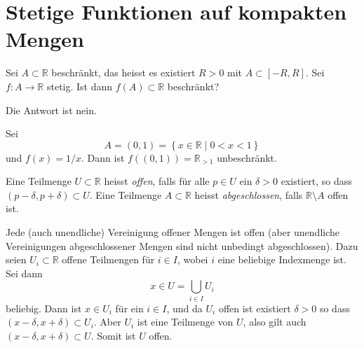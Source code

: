 \documentclass[../main.tex]{subfiles}
\begin{document}
\section{Stetige Funktionen auf kompakten Mengen}

\begin{question}
Sei $A \subset \mathbb{R}$ beschränkt,
das heisst es existiert $R > 0$ 
mit $A \subset [-R, R]$.
Sei $f \colon A \to \mathbb{R}$ stetig.
Ist dann $f(A) \subset \mathbb{R}$ beschränkt?
\end{question}

Die Antwort ist nein. 

\begin{example}
  Sei 
  \[
    A = (0, 1) = \left\{x \in \mathbb{R} \mid 0 < x < 1\right\}
  \]
  und $f(x) = 1/x$. Dann ist $f((0, 1)) = \mathbb{R}_{>1}$ 
  unbeschränkt.
\end{example}

\begin{definition}
  Eine Teilmenge
  $U \subset \mathbb{R}$ 
  heisst \emph{offen},
  falls für
  alle $p \in U$ ein
  $\delta > 0$ existiert,
  so dass $(p - \delta, p + \delta)
  \subset U$.
Eine Teilmenge
  $A \subset \mathbb{R}$ 
  heisst  \emph{abgeschlossen},
  falls $\mathbb{R} \setminus A$ 
  offen ist.
\end{definition}

\begin{remark}
  Jede (auch unendliche) Vereinigung offener Mengen ist offen
  (aber unendliche Vereinigungen abgeschlossener Mengen
  sind nicht unbedingt abgeschlossen).
  Dazu seien $U_i \subset \mathbb{R}$ offene Teilmengen
  für $i \in I$, wobei $i$ eine 
  beliebige Indexmenge ist. Sei dann
  \[
    x \in U = \bigcup_{i \in I} U_i
  \]
  beliebig. Dann ist $x \in U_i$ für
  ein $i \in I$, und da $U_i$ offen ist existiert
  $\delta > 0$ so dass $(x - \delta, x + \delta) \subset U_i$.
  Aber $U_i$ ist eine Teilmenge von $U$, also
  gilt auch $(x - \delta, x + \delta) \subset U$. Somit ist
  $U$ offen.
\end{remark}
\end{document}
